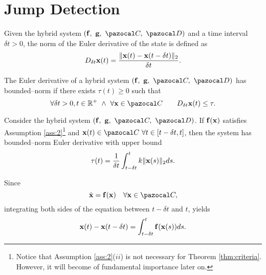 \clearpage
\section{Jump Detection}\label{JumpD}
%
\begin{defn}
	Given the hybrid system $(\mathbf{\mathbf{f}},~\mathbf{g},~\C,~\D)$ and a time interval $\delta t>0$, the norm of the Euler derivative of the state is defined as
	\begin{equation}
		D_{\delta t}\mathbf{x}(t)= \frac{\|\mathbf{x}(t)-\mathbf{x}(t-\delta t)\|_2}{\delta t}.
	\end{equation}
\end{defn}
%
\begin{defn}
	The Euler derivative of a hybrid system $(\mathbf{\mathbf{f}},~\mathbf{g},~\C,~\D)$ has bounded--norm if there exists $\tau(t)\geq 0$ such that
	\begin{equation}
		\forall\delta t>0,t\in\R^+~\land~\forall \x\in\C\quad\quad D_{\delta t}\x(t)\leq\tau.
	\end{equation}
\end{defn}
%

\begin{thm}\label{thm:criteria}
   	Consider the hybrid system
   	$(\mathbf{\mathbf{f}},~\mathbf{g},~\C,~\D)$. If $\mathbf{\mathbf{f}}(\mathbf{x})$ satisfies
   	Assumption \ref{ass:2}\footnote{Notice that Assumption \ref{ass:2}($ii$) is
   	not necessary for Theorem \ref{thm:criteria}. However, it will become of fundamental
   	importance later on.} and $\x(t)\in \C ~\forall t \in [t-\delta t,t]$,
   	then the system has bounded--norm Euler derivative with upper bound
	\begin{equation}\label{eq:bound}
		\tau(t)=\frac{1}{\delta t}\int_{t-\delta t}^{t}k\|\mathbf{x}(s)\|_2ds.
	\end{equation}
\end{thm}
%
\proof
    Since
    \begin{equation}
        \dot{\x} = \mathbf{\mathbf{f}}(\x)\quad\forall\x\in\C, 
    \end{equation}
    integrating both sides of the equation between $t-\delta t$ and $t$, yields
    \begin{equation}
        \mathbf{x}(t)-\mathbf{x}(t-\delta t) = \int_{t-\delta t}^{t}\mathbf{\mathbf{f}}(\mathbf{x}(s))ds.
    \end{equation}
    
